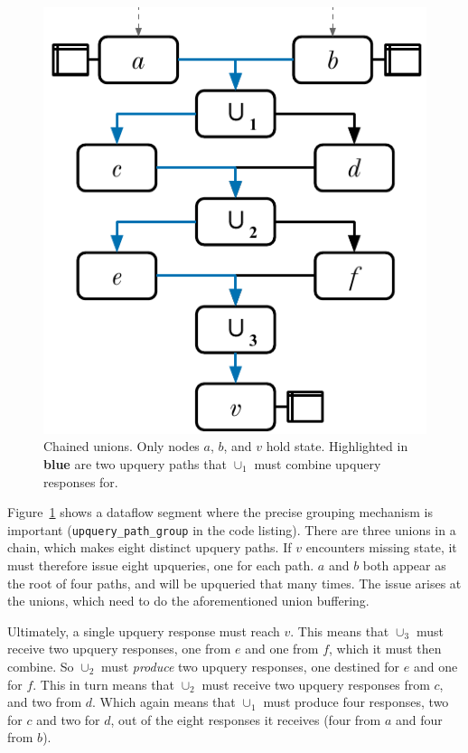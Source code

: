 \begin{figure}[t]
  \centering
  \includegraphics{diagrams/Chained Unions.pdf}
  \caption{Chained unions. Only nodes $a$, $b$, and $v$ hold state. Highlighted
  in \textbf{\color{set1}blue} are two upquery paths that $\cup_1$ must combine
  upquery responses for.}
  \label{f:chained-union}
\end{figure}

Figure~\ref{f:chained-union} shows a dataflow segment where the precise grouping
mechanism is important (\texttt{upquery\_path\_group} in the code listing).
There are three unions in a chain, which makes eight distinct upquery paths. If
$v$ encounters missing state, it must therefore issue eight upqueries, one for
each path. $a$ and $b$ both appear as the root of four paths, and will be
upqueried that many times. The issue arises at the unions, which need to do
the aforementioned union buffering.

Ultimately, a single upquery response must reach $v$. This means that $\cup_3$
must receive two upquery responses, one from $e$ and one from $f$, which it must
then combine. So $\cup_2$ must \emph{produce} two upquery responses, one
destined for $e$ and one for $f$. This in turn means that $\cup_2$ must receive
two upquery responses from $c$, and two from $d$. Which again means that
$\cup_1$ must produce four responses, two for $c$ and two for $d$, out of the
eight responses it receives (four from $a$ and four from $b$).

